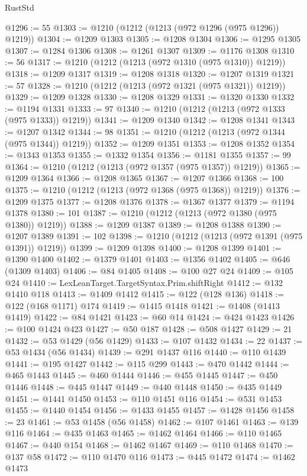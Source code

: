 \begin{lexlean}{RustStd}
\begin{coremodule}
{\begin{coremodule}
{{{{{{{{{{{{{{{{{{{{{{{{{{{{{{{{{{{{{{{{{{{{{{{@1296 := 55
@1303 := @1210 (@1212 (@1213 (@972 @1296 (@975 @1296)) @1219))
@1304 := @1209 @1303
@1305 := @1208 @1304
@1306 := @1295 @1305
@1307 := @1284 @1306
@1308 := @1261 @1307
@1309 := @1176 @1308
@1310 := 56
@1317 := @1210 (@1212 (@1213 (@972 @1310 (@975 @1310)) @1219))
@1318 := @1209 @1317
@1319 := @1208 @1318
@1320 := @1207 @1319
@1321 := 57
@1328 := @1210 (@1212 (@1213 (@972 @1321 (@975 @1321)) @1219))
@1329 := @1209 @1328
@1330 := @1208 @1329
@1331 := @1320 @1330
@1332 := @1194 @1331
@1333 := 97
@1340 := @1210 (@1212 (@1213 (@972 @1333 (@975 @1333)) @1219))
@1341 := @1209 @1340
@1342 := @1208 @1341
@1343 := @1207 @1342
@1344 := 98
@1351 := @1210 (@1212 (@1213 (@972 @1344 (@975 @1344)) @1219))
@1352 := @1209 @1351
@1353 := @1208 @1352
@1354 := @1343 @1353
@1355 := @1332 @1354
@1356 := @1181 @1355
@1357 := 99
@1364 := @1210 (@1212 (@1213 (@972 @1357 (@975 @1357)) @1219))
@1365 := @1209 @1364
@1366 := @1208 @1365
@1367 := @1207 @1366
@1368 := 100
@1375 := @1210 (@1212 (@1213 (@972 @1368 (@975 @1368)) @1219))
@1376 := @1209 @1375
@1377 := @1208 @1376
@1378 := @1367 @1377
@1379 := @1194 @1378
@1380 := 101
@1387 := @1210 (@1212 (@1213 (@972 @1380 (@975 @1380)) @1219))
@1388 := @1209 @1387
@1389 := @1208 @1388
@1390 := @1207 @1389
@1391 := 102
@1398 := @1210 (@1212 (@1213 (@972 @1391 (@975 @1391)) @1219))
@1399 := @1209 @1398
@1400 := @1208 @1399
@1401 := @1390 @1400
@1402 := @1379 @1401
@1403 := @1356 @1402
@1405 := @646 (@1309 @1403)
@1406 := @84 @1405
@1408 := @100 @27 @24
@1409 := @105 @24
@1410 := LexLeanTarget.TargetSyntax.Prim.shiftRight
@1412 := @132 @1410 @118
@1413 := @1409 @1412
@1415 := @122 (@128 @136)
@1418 := @122 (@168 @1171) @174
@1419 := @1415 @1418
@1421 := @1408 (@1413 @1419)
@1422 := @84 @1421
@1423 := @60 @14
@1424 := @424 @1423
@1426 := @100 @1424 @423
@1427 := @50 @187
@1428 := @508 @1427
@1429 := 21
@1432 := @53 @1429 (@56 @1429)
@1433 := @107 @1432
@1434 := 22
@1437 := @53 @1434 (@56 @1434)
@1439 := @291 @1437 @116
@1440 := @110 @1439
@1441 := @195 @1427
@1442 := @115 @299
@1443 := @470 @1442
@1444 := @465 @1443
@1445 := @460 @1444
@1446 := @455 @1445
@1447 := @450 @1446
@1448 := @445 @1447
@1449 := @440 @1448
@1450 := @435 @1449
@1451 := @1441 @1450
@1453 := @110 @1451 @116
@1454 := @531 @1453
@1455 := @1440 @1454
@1456 := @1433 @1455
@1457 := @1428 @1456
@1458 := 23
@1461 := @53 @1458 (@56 @1458)
@1462 := @107 @1461
@1463 := @139 @116
@1464 := @435 @1463
@1465 := @1462 @1464
@1466 := @110 @1465
@1467 := @440 @154
@1468 := @1462 @1467
@1469 := @110 @1468
@1470 := @137 @58
@1472 := @110 @1470 @116
@1473 := @445 @1472
@1474 := @1462 @1473
}}}}}}}}}}}}}}}}}}}}}}}}}}}}}}}}}}}}}}}}}}}}}}}
\end{coremodule}}
\end{coremodule}
\end{lexlean}
